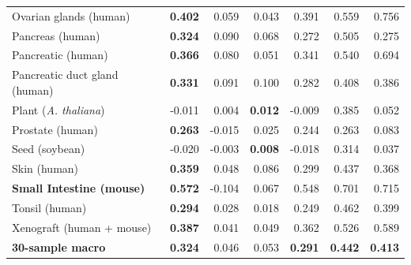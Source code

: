 \documentclass[10pt]{article}
\begin{document}
\begin{center}
\begin{tabular*}{\linewidth}{@{\extracolsep{\fill}}lrrrrrr@{}}
Ovarian glands (human) & \textbf{0.402} & 0.059 & 0.043 & 0.391 & 0.559 & 0.756 \\
Pancreas (human) & \textbf{0.324} & 0.090 & 0.068 & 0.272 & 0.505 & 0.275 \\
Pancreatic (human) & \textbf{0.366} & 0.080 & 0.051 & 0.341 & 0.540 & 0.694 \\
Pancreatic duct gland (human) & \textbf{0.331} & 0.091 & 0.100 & 0.282 & 0.408 & 0.386 \\
Plant (\textit{A. thaliana}) & -0.011 & 0.004 & \textbf{0.012} & -0.009 & 0.385 & 0.052 \\
Prostate (human) & \textbf{0.263} & -0.015 & 0.025 & 0.244 & 0.263 & 0.083 \\
Seed (soybean) & -0.020 & -0.003 & \textbf{0.008} & -0.018 & 0.314 & 0.037 \\
Skin (human) & \textbf{0.359} & 0.048 & 0.086 & 0.299 & 0.437 & 0.368 \\
\textbf{Small Intestine (mouse)} & \textbf{0.572} & -0.104 & 0.067 & 0.548 & 0.701 & 0.715 \\
Tonsil (human) & \textbf{0.294} & 0.028 & 0.018 & 0.249 & 0.462 & 0.399 \\
Xenograft (human + mouse) & \textbf{0.387} & 0.041 & 0.049 & 0.362 & 0.526 & 0.589 \\
\midrule
\textbf{30-sample macro} & \textbf{0.324} & 0.046 & 0.053 &
\textbf{0.291} & \textbf{0.442} & \textbf{0.413} \\
\bottomrule
\end{tabular*}
\endgroup
\end{center}
\end{document}
